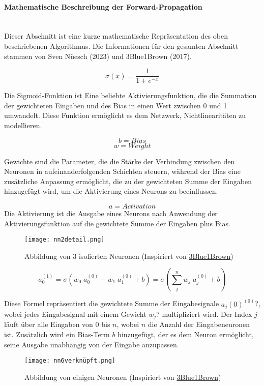 \paragraph{Mathematische Beschreibung der Forward-Propagation}
\label{sec:forward_propagation_math}
\mbox{}\\\noindent Dieser Abschnitt ist eine kurze mathematische Repräsentation des oben beschriebenen Algorithmus. Die Informationen für den gesamten Abschnitt stammen von Sven Nüesch (2023) und 3Blue1Brown (2017).

\[\sigma(x)=\frac{1}{1+e^{-x}}\]

\noindent Die Sigmoid-Funktion ist Eine beliebte Aktivierungsfunktion, die die Summation der gewichteten Eingaben und des Bias in einen Wert zwischen 0 und 1 umwandelt. Diese Funktion ermöglicht es dem Netzwerk, Nichtlinearitäten zu modellieren.

\[b=Bias\]
\[w=Weight\]

\noindent Gewichte sind die Parameter, die die Stärke der Verbindung zwischen den Neuronen in aufeinanderfolgenden Schichten steuern, während der Bias eine zusätzliche Anpassung ermöglicht, die zu der gewichteten Summe der Eingaben hinzugefügt wird, um die Aktivierung eines Neurons zu beeinflussen.

\[a=Activation\]
Die Aktivierung ist die Ausgabe eines Neurons nach Anwendung der Aktivierungsfunktion auf die gewichtete Summe der Eingaben plus Bias.

\begin{figure}[H]
	\centering
		\texttt{[image: nn2detail.png]}
	\label{fig:nn2detail}
	\caption{Abbildung von 3 isolierten Neuronen (Inspiriert von \href{https://www.youtube.com/watch?v=aircAruvnKk}{3Blue1Brown})}
\end{figure}

\[a_{0}^{(1)} = \sigma(w_{0}\; a_{0}^{(0)} + w_{1}\; a_{1}^{(0)} + b) = \sigma(\sum_{j}^{n} w_{j}\;a_{j} ^{(0)} + b)\]

\noindent Diese Formel repräsentiert die gewichtete Summe der Eingabesignale $a_j(0)^(0)$?, wobei jedes Eingabesignal mit einem Gewicht $w_j$? multipliziert wird. Der Index $j$ läuft über alle Eingaben von 0 bis $n$, wobei $n$ die Anzahl der Eingabeneuronen ist. Zusätzlich wird ein Bias-Term $b$ hinzugefügt, der es dem Neuron ermöglicht, seine Ausgabe unabhängig von der Eingabe anzupassen.

\begin{figure}[H]
	\centering
		\texttt{[image: nn6verknüpft.png]}
	\label{fig:nn6verknüpft}
	\caption{Abbildung von einigen Neuronen (Inspiriert von \href{https://www.youtube.com/watch?v=aircAruvnKk}{3Blue1Brown})}
\end{figure}

